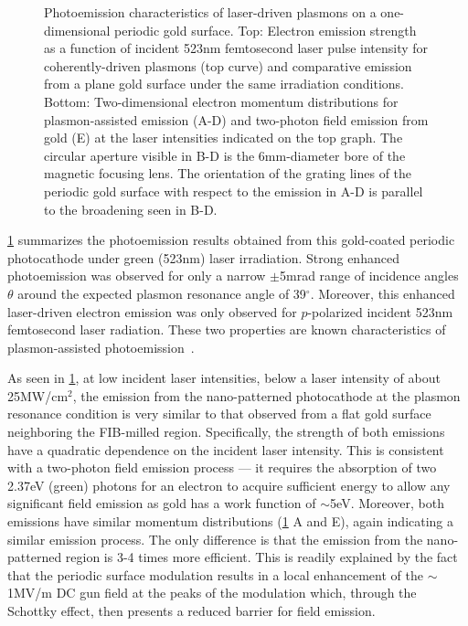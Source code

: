 \begin{figure}
  \centering
  
  \caption[Photoemission characteristics of laser-driven plasmons on a one-dimensional periodic gold surface]{
    Photoemission characteristics of laser-driven plasmons on a one-dimensional periodic gold surface.
    Top: Electron emission strength as a function of incident 523nm femtosecond laser pulse intensity for coherently-driven plasmons (top curve)
      and comparative emission from a plane gold surface under the same irradiation conditions.
    Bottom: Two-dimensional electron momentum distributions for plasmon-assisted emission (A-D) and two-photon field emission from gold (E) at the laser intensities indicated on the top graph.
    The circular aperture visible in B-D is the 6mm-diameter bore of the magnetic focusing lens.
    The orientation of the grating lines of the periodic gold surface with respect to the emission in A-D is parallel to the broadening seen in B-D.
  }
  \label{fig:pape}
\end{figure}

\ref{fig:pape} summarizes the photoemission results obtained from this gold-coated periodic photocathode under green (523nm) laser irradiation.
Strong enhanced photoemission was observed for only a narrow $\pm$5mrad range of incidence angles $\theta$ around the expected plasmon resonance angle of 39$^{\circ}$.
Moreover, this enhanced laser-driven electron emission was only observed for $p$-polarized incident 523nm femtosecond laser radiation.
These two properties are known characteristics of plasmon-assisted photoemission~\cite{kupersztych_ponderomotive_2001,kupersztych_anomalous_2005,li_surface_2013}.

As seen in \ref{fig:pape}, at low incident laser intensities, below a laser intensity of about 25MW/cm$^2$, the emission from the nano-patterned photocathode at the plasmon resonance condition is very similar to that observed from a flat gold surface neighboring the FIB-milled region.
Specifically, the strength of both emissions have a quadratic dependence on the incident laser intensity.
This is consistent with a two-photon field emission process --- it requires the absorption of two 2.37eV (green) photons for an electron to acquire sufficient energy to allow any significant field emission as gold has a work function of $\sim$5eV.
Moreover, both emissions have similar momentum distributions (\ref{fig:pape} A and E), again indicating a similar emission process.
The only difference is that the emission from the nano-patterned region is 3-4 times more efficient.
This is readily explained by the fact that the periodic surface modulation results in a local enhancement of the $\sim$1MV/m DC gun field at the peaks of the modulation which, through the Schottky effect, then presents a reduced barrier for field emission.

